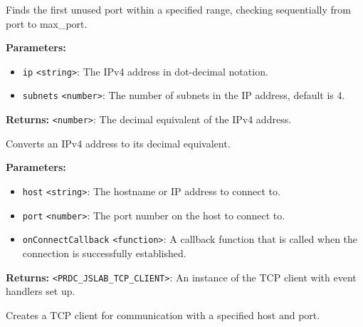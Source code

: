 \documentclass[12pt,a4paper]{article}
\begin{document}
\noindent Finds the first unused port within a specified range, checking sequentially from \textasciigrave{}port\textasciigrave{} to \textasciigrave{}max\_port\textasciigrave{}.

\vspace{5mm}
\noindent {}


\noindent \textbf{Parameters:}
\begin{itemize}
  \item \texttt{ip} \texttt{<string>}: The IPv4 address in dot-decimal notation.
  \item \texttt{subnets} \texttt{<number>}: The number of subnets in the IP address, default is 4.
\end{itemize}

\noindent \textbf{Returns:} \texttt{<number>}: The decimal equivalent of the IPv4 address.

\noindent Converts an IPv4 address to its decimal equivalent.

\vspace{5mm}
\noindent {}


\noindent \textbf{Parameters:}
\begin{itemize}
  \item \texttt{host} \texttt{<string>}: The hostname or IP address to connect to.
  \item \texttt{port} \texttt{<number>}: The port number on the host to connect to.
  \item \texttt{onConnectCallback} \texttt{<function>}: A callback function that is called when the connection is successfully established.
\end{itemize}

\noindent \textbf{Returns:} \texttt{<PRDC\_JSLAB\_TCP\_CLIENT>}: An instance of the TCP client with event handlers set up.

\noindent Creates a TCP client for communication with a specified host and port.

\vspace{5mm}
\noindent {}
\end{document}
